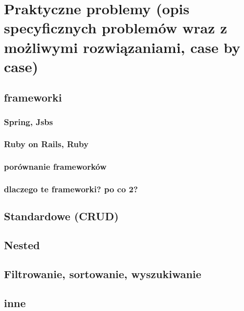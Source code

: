 \chapter{Praktyczne problemy (opis specyficznych problemów wraz z możliwymi rozwiązaniami, case by case)}

\section{frameworki}
\subsection{Spring, Jsbs}
\subsection{Ruby on Rails, Ruby}
\subsection{porównanie frameworków}
\subsection{dlaczego te frameworki? po co 2?}

\section{Standardowe (CRUD)}
\section{Nested}
\section{Filtrowanie, sortowanie, wyszukiwanie}
\section{inne}
